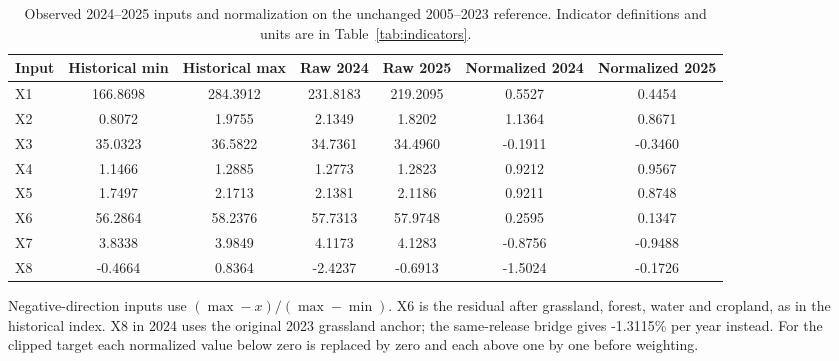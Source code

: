 \documentclass[preprint,11pt,authoryear]{elsarticle}
\begin{document}
\begin{table}[htbp]
\centering
\caption{Observed 2024--2025 inputs and normalization on the unchanged 2005--2023 reference. Indicator definitions and units are in Table~\ref{tab:indicators}.}
\label{tab:observed-inputs}
\footnotesize
\setlength{\tabcolsep}{3pt}
\begin{tabular}{lcccccc}
\toprule
Input & Historical min & Historical max & Raw 2024 & Raw 2025 & Normalized 2024 & Normalized 2025 \\
\midrule
X1 & 166.8698 & 284.3912 & 231.8183 & 219.2095 & 0.5527 & 0.4454 \\
X2 & 0.8072 & 1.9755 & 2.1349 & 1.8202 & 1.1364 & 0.8671 \\
X3 & 35.0323 & 36.5822 & 34.7361 & 34.4960 & -0.1911 & -0.3460 \\
X4 & 1.1466 & 1.2885 & 1.2773 & 1.2823 & 0.9212 & 0.9567 \\
X5 & 1.7497 & 2.1713 & 2.1381 & 2.1186 & 0.9211 & 0.8748 \\
X6 & 56.2864 & 58.2376 & 57.7313 & 57.9748 & 0.2595 & 0.1347 \\
X7 & 3.8338 & 3.9849 & 4.1173 & 4.1283 & -0.8756 & -0.9488 \\
X8 & -0.4664 & 0.8364 & -2.4237 & -0.6913 & -1.5024 & -0.1726 \\
\bottomrule
\end{tabular}

\vspace{2pt}
{\scriptsize Negative-direction inputs use $(\max-x)/(\max-\min)$. X6 is the residual after grassland, forest, water and cropland, as in the historical index. X8 in 2024 uses the original 2023 grassland anchor; the same-release bridge gives -1.3115\% per year instead. For the clipped target each normalized value below zero is replaced by zero and each above one by one before weighting.}
\end{table}
\end{document}
